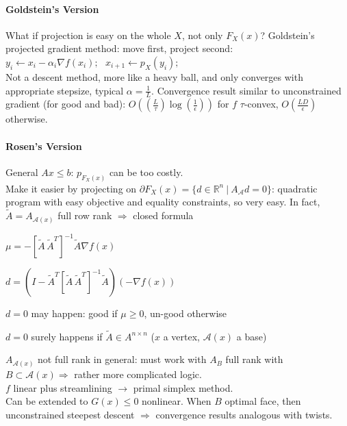 \documentclass[10pt]{report}
\begin{document}
\paragraph{Goldstein's Version} What if projection is easy on the whole $X$, not only $F_X(x)$? Goldstein's projected gradient method: move first, project second: $y_i \leftarrow x_i - \alpha_i\nabla f(x_i);\:\:\:x_{i+1}\leftarrow p_X(y_i);$\\
Not a descent method, more like a heavy ball, and only converges with appropriate stepsize, typical $\alpha=\frac{1}{L}$. Convergence result similar to unconstrained gradient (for good and bad): $O\left(\left(\frac{L}{\tau}\right)\log\left(\frac{1}{\epsilon}\right)\right)$ for $f$ $\tau$-convex, $O\left(\frac{LD}{\epsilon}\right)$ otherwise.
\paragraph{Rosen's Version} General $Ax\leq b$: $p_{F_X(x)}$ can be too costly.\\
Make it easier by projecting on $\partial F_X(x)=\{d\in \mathbb{R}^n\:|\:A_{\mathscr{A}}d=0\}$: quadratic program with easy objective and equality constraints, so very easy. In fact, $\tilde{A}=A_{\mathscr{A}(x)}$ full row rank $\Rightarrow$ closed formula\begin{list}{}{}
	\item $\mu=-[\tilde{A}\,\tilde{A}^T]^{-1}\tilde{A}\nabla f(x)$
	\item $d = (I-\tilde{A}^T[\tilde{A}\,\tilde{A}^T]^{-1}\tilde{A})(-\nabla f(x))$
	\begin{list}{}{}
		\item $d = 0$ may happen: good if $\mu \geq 0$, un-good otherwise
		\item $d = 0$ surely happens if $\tilde{A}\in A^{n\times n}$ ($x$ a vertex, $\mathscr{A}(x)$ a base)
	\end{list}
\end{list}
$A_{\mathscr{A}(x)}$ not full rank in general: must work with $A_B$ full rank with $B\subset \mathscr{A}(x) \Rightarrow$ rather more complicated logic.\\
$f$ linear plus streamlining $\longrightarrow$ primal simplex method.\\
Can be extended to $G(x)\leq 0$ nonlinear. When $B$ optimal face, then unconstrained steepest descent $\Rightarrow$ convergence results analogous with twists.
\end{document}
